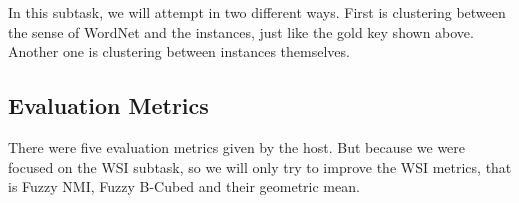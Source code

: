 In this subtask, we will attempt in two different ways. First is clustering between the sense of WordNet and the instances, just like the gold key shown above. Another one is clustering between instances themselves.

\subsection*{Evaluation Metrics}

There were five evaluation metrics given by the host. But because we were focused on the WSI subtask, so we will only try to improve the WSI metrics, that is Fuzzy NMI, Fuzzy B-Cubed and their geometric mean.
